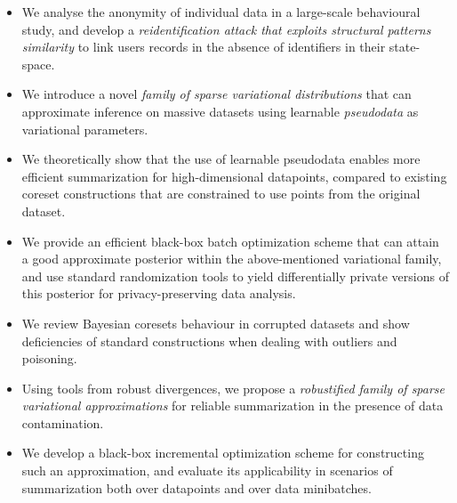 \begin{itemize}
	\item We analyse the anonymity of individual data in a large-scale behavioural study, and develop a \emph{reidentification attack that exploits structural patterns similarity} to link users records in the absence of identifiers in their state-space.
	\item We introduce a novel \emph{family of sparse variational distributions} that can approximate inference on massive datasets using learnable \emph{pseudodata} as variational parameters.
	\item We theoretically show that the use of learnable pseudodata enables more efficient summarization for high-dimensional datapoints, compared to existing coreset constructions that are constrained to use points from the original dataset.
	\item We provide an efficient black-box batch optimization scheme that can attain a good approximate posterior within the above-mentioned variational family, and use standard randomization tools to yield differentially private versions of this posterior for privacy-preserving data analysis.
	\item We review Bayesian coresets behaviour in corrupted datasets and show deficiencies of standard constructions when dealing with outliers and poisoning.
	\item Using tools from robust divergences, we propose a \emph{robustified family of sparse variational approximations} for reliable summarization in the presence of data contamination.
	\item We develop a black-box incremental optimization scheme for constructing such an approximation, and evaluate its applicability in scenarios of summarization both over datapoints and over data minibatches.
\end{itemize}

